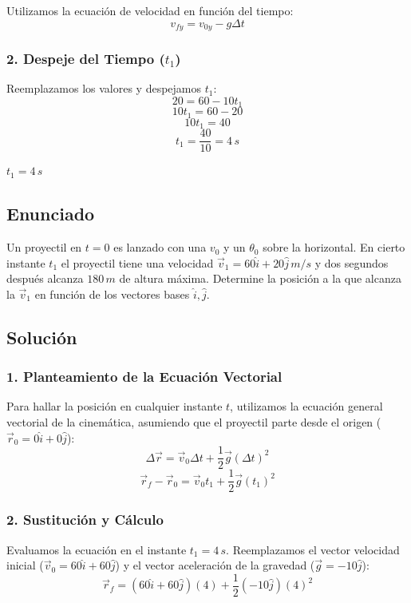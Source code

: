 \documentclass[12pt, a4paper]{article}
\begin{document}
Utilizamos la ecuación de velocidad en función del tiempo:
$$ v_{fy} = v_{0y} - g \Delta t $$

\subsubsection*{2. Despeje del Tiempo ($t_1$)}
Reemplazamos los valores y despejamos $t_1$:
$$ 20 = 60 - 10 t_1 $$
$$ 10 t_1 = 60 - 20 $$
$$ 10 t_1 = 40 $$
$$ t_1 = \frac{40}{10} = 4 \, \si{s} $$

\begin{tcolorbox}[colback=green!5!white, colframe=green!50!black, title=Respuesta Final]
\centering \Large $t_1 = 4 \, \si{s}$
\end{tcolorbox}

\newpage

\subsection*{Enunciado}
Un proyectil en $t = 0$ es lanzado con una $v_0$ y un $\theta_0$ sobre la horizontal. En cierto instante $t_1$ el proyectil tiene una velocidad $\vec{v}_1 = 60\hat{i} + 20\hat{j} \, \si{m/s}$ y dos segundos después alcanza $180 \, \si{m}$ de altura máxima. Determine la posición a la que alcanza la $\vec{v}_1$ en función de los vectores bases $\hat{i}, \hat{j}$.

\subsection*{Solución}

\subsubsection*{1. Planteamiento de la Ecuación Vectorial}
Para hallar la posición en cualquier instante $t$, utilizamos la ecuación general vectorial de la cinemática, asumiendo que el proyectil parte desde el origen ($\vec{r}_0 = 0\hat{i} + 0\hat{j}$):
$$ \Delta\vec{r} = \vec{v}_0 \Delta t + \frac{1}{2} \vec{g} (\Delta t)^2 $$
$$ \vec{r}_f - \vec{r}_0 = \vec{v}_0 t_1 + \frac{1}{2} \vec{g} (t_1)^2 $$

\subsubsection*{2. Sustitución y Cálculo}
Evaluamos la ecuación en el instante $t_1 = 4 \, \si{s}$. Reemplazamos el vector velocidad inicial ($\vec{v}_0 = 60\hat{i} + 60\hat{j}$) y el vector aceleración de la gravedad ($\vec{g} = -10\hat{j}$):
$$ \vec{r}_f = (60\hat{i} + 60\hat{j})(4) + \frac{1}{2} (-10\hat{j}) (4)^2 $$
\end{document}
